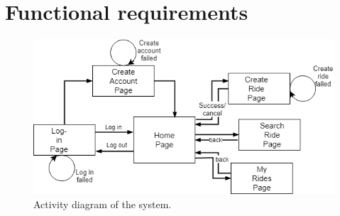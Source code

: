 \documentclass{article}
\begin{document}
\section{Functional requirements}

\begin{figure}
  \centering
  \includegraphics[scale=0.6]{forSRS.png}
  \caption{Activity diagram of the system.}
  \label{fig:activity}
\end{figure}
\end{document}
